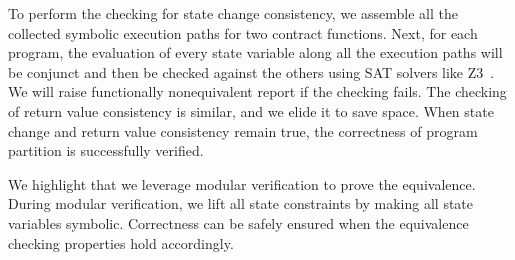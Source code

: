 To perform the checking for state change consistency, we assemble all the collected symbolic execution paths for two contract functions.
Next, for each program, the evaluation of every state variable along all the execution paths will be conjunct and then be checked against the others using SAT solvers like Z3~\cite{de2008z3}.
We will raise functionally nonequivalent report if the checking fails.
The checking of return value consistency is similar, and we elide it to save space.
When state change and return value consistency remain true, the correctness of program partition is successfully verified.

We highlight that we leverage modular verification to prove the equivalence.
During modular verification, we lift all state constraints by making all state variables symbolic.
Correctness can be safely ensured when the equivalence checking properties hold accordingly.






